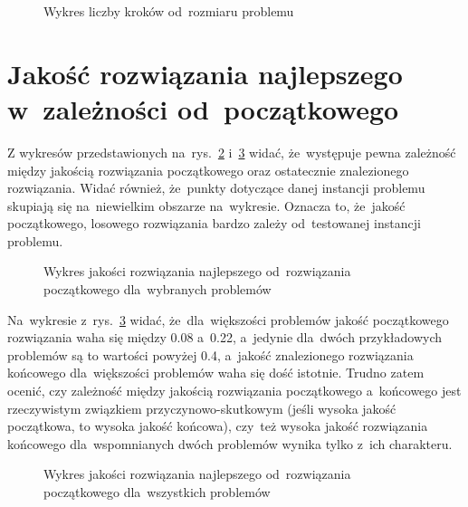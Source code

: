 \documentclass[a4paper,10pt]{article}
\begin{document}
\begin{figure}[!htpb]
\begin{center}

\caption{Wykres liczby kroków od~rozmiaru problemu}
\label{fig:stepssize}
\end{center}
\end{figure}

\section{Jakość rozwiązania najlepszego w~zależności od~początkowego}
Z wykresów przedstawionych na~rys.~\ref{fig:initendquality} i~\ref{fig:initendqualityall} widać, że~występuje pewna zależność
między jakością rozwiązania początkowego oraz ostatecznie znalezionego rozwiązania. Widać również, że~punkty dotyczące
danej instancji problemu skupiają się na~niewielkim obszarze na~wykresie. Oznacza to, że~jakość początkowego, losowego
rozwiązania bardzo zależy od~testowanej instancji problemu.

\begin{figure}
\begin{center}

\caption{Wykres jakości rozwiązania najlepszego od~rozwiązania początkowego dla~wybranych problemów}
\label{fig:initendquality}
\end{center}
\end{figure}

Na~wykresie z~rys.~\ref{fig:initendqualityall} widać, że~dla~większości
problemów jakość początkowego rozwiązania waha się między \num{0.08} a~\num{0.22}, a~jedynie dla~dwóch przykładowych problemów
są to wartości powyżej \num{0.4}, a~jakość znalezionego rozwiązania końcowego dla~większości problemów waha się dość istotnie.
Trudno zatem ocenić, czy zależność między jakością rozwiązania początkowego a~końcowego jest rzeczywistym związkiem przyczynowo-skutkowym
(jeśli wysoka jakość początkowa, to wysoka jakość końcowa), czy~też wysoka jakość rozwiązania końcowego dla~wspomnianych dwóch problemów
wynika tylko z~ich charakteru.

\begin{figure}[!htpb]
\begin{center}

\caption{Wykres jakości rozwiązania najlepszego od~rozwiązania początkowego dla~wszystkich problemów}
\label{fig:initendqualityall}
\end{center}
\end{figure}
\end{document}
